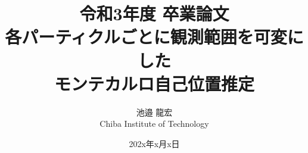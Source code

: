 \documentclass[a4paper,11pt]{jsbook}
\begin{document}
\title{令和3年度 卒業論文\\
各パーティクルごとに観測範囲を可変にした\\モンテカルロ自己位置推定}

\author{池邉 龍宏 \\
Chiba Institute of Technology}

\date{202x年x月x日}

\maketitle



\tableofcontents



\cleardoublepage
{}
 





% 






\newpage
\printindex
\end{document}
